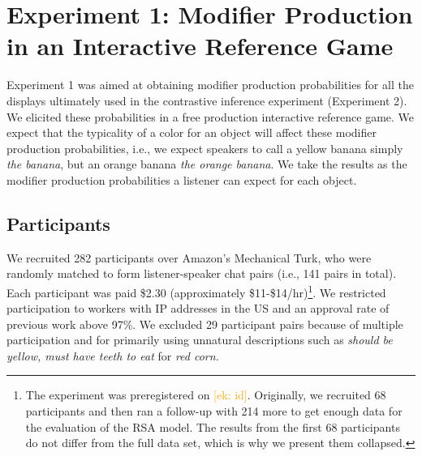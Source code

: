 \documentclass[10pt,letterpaper]{article}
\newcommand{\ek}[1]{\textcolor{Orange}{[ek: #1]}}
\begin{document}
\section{Experiment 1: Modifier Production in an Interactive Reference Game}

Experiment 1 was aimed at obtaining modifier production probabilities for all the displays ultimately used in the contrastive inference experiment (Experiment 2). We elicited these probabilities in a free production interactive reference game. We expect that the typicality of a color for an object will affect these modifier production probabilities, i.e., we expect speakers to call a yellow banana simply \textit{the banana}, but an orange banana \textit{the orange banana}. We take the results as the modifier production probabilities a listener can expect for each object.

\subsection{Participants}
We recruited 282 participants over Amazon's Mechanical Turk, who were randomly matched to form listener-speaker chat pairs (i.e., 141 pairs in total). 
Each participant was paid \$2.30 (approximately \$11-\$14/hr)\footnote{The experiment was preregistered on \ek{id}. Originally, we recruited 68 participants and then ran a follow-up with 214 more to get enough data for the evaluation of the RSA model. The results from the first 68 participants do not differ from the full data set, which is why we present them collapsed.}. We restricted participation to workers with IP addresses in the US and an approval rate of previous work above 97\%.
We excluded 29 participant pairs because of multiple participation and for primarily using unnatural descriptions such as \textit{should be yellow, must have teeth to eat} for \textit{red corn}.

\end{document}
